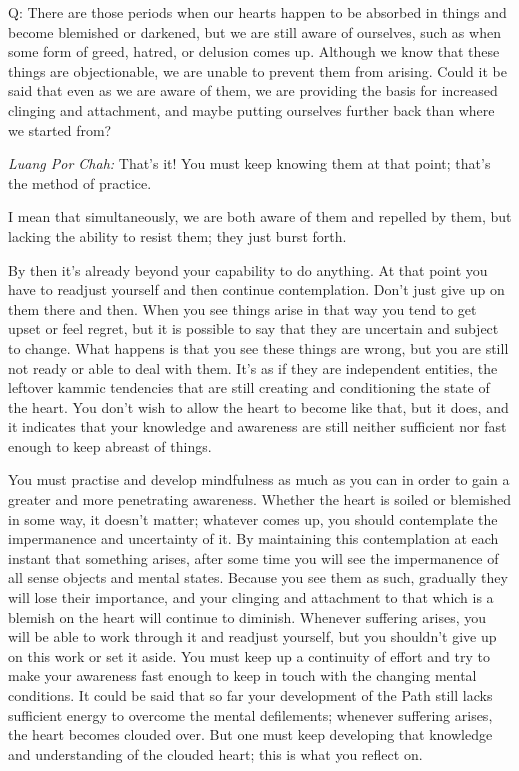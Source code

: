 
Q: There are those periods when our hearts happen to be absorbed in
things and become blemished or darkened, but we are still aware of
ourselves, such as when some form of greed, hatred, or delusion comes
up. Although we know that these things are objectionable, we are unable
to prevent them from arising. Could it be said that even as we are aware
of them, we are providing the basis for increased clinging and
attachment, and maybe putting ourselves further back than where we
started from? 

\emph{Luang Por Chah:} That's it! You must keep knowing them at that point; 
that's the method of practice. 

I mean that simultaneously, we are both aware of them and repelled by
them, but lacking the ability to resist them; they just burst forth. 

By then it's already beyond your capability to do anything. At that
point you have to readjust yourself and then continue contemplation. 
Don't just give up on them there and then. When you see things arise in
that way you tend to get upset or feel regret, but it is possible to say
that they are uncertain and subject to change. What happens is that you
see these things are wrong, but you are still not ready or able to deal
with them. It's as if they are independent entities, the leftover kammic
tendencies that are still creating and conditioning the state of the
heart. You don't wish to allow the heart to become like that, but it
does, and it indicates that your knowledge and awareness are still
neither sufficient nor fast enough to keep abreast of things. 

You must practise and develop mindfulness as much as you can in order to
gain a greater and more penetrating awareness. Whether the heart is
soiled or blemished in some way, it doesn't matter; whatever comes up, 
you should contemplate the impermanence and uncertainty of it. By
maintaining this contemplation at each instant that something arises, 
after some time you will see the impermanence of all sense objects and
mental states. Because you see them as such, gradually they will lose
their importance, and your clinging and attachment to that which is a
blemish on the heart will continue to diminish. Whenever suffering
arises, you will be able to work through it and readjust yourself, but
you shouldn't give up on this work or set it aside. You must keep up a
continuity of effort and try to make your awareness fast enough to keep
in touch with the changing mental conditions. It could be said that so
far your development of the Path still lacks sufficient energy to
overcome the mental defilements; whenever suffering arises, the heart
becomes clouded over. But one must keep developing that knowledge and
understanding of the clouded heart; this is what you reflect on. 

